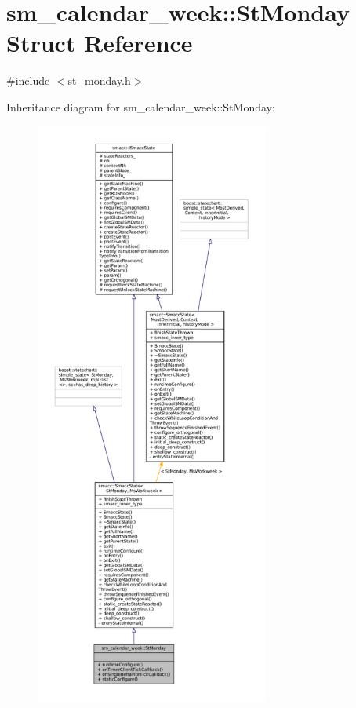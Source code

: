 \hypertarget{structsm__calendar__week_1_1StMonday}{}\section{sm\+\_\+calendar\+\_\+week\+:\+:St\+Monday Struct Reference}
\label{structsm__calendar__week_1_1StMonday}


{\ttfamily \#include $<$st\+\_\+monday.\+h$>$}



Inheritance diagram for sm\+\_\+calendar\+\_\+week\+:\+:St\+Monday\+:
\nopagebreak
\begin{figure}[H]
\begin{center}
\leavevmode
\includegraphics[height=550pt]{structsm__calendar__week_1_1StMonday__inherit__graph}
\end{center}
\end{figure}



